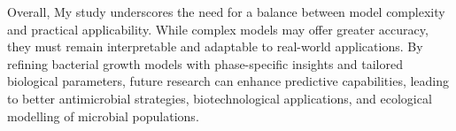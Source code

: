 \documentclass[11pt]{article}
\begin{document}
Overall, My study underscores the need for a balance between model complexity and practical applicability. While complex models may offer greater accuracy, they must remain interpretable and adaptable to real-world applications. By refining bacterial growth models with phase-specific insights and tailored biological parameters, future research can enhance predictive capabilities, leading to better antimicrobial strategies, biotechnological applications, and ecological modelling of microbial populations.





\newpage
\begin{sloppy}
\printbibliography
\end{sloppy}
\end{document}
